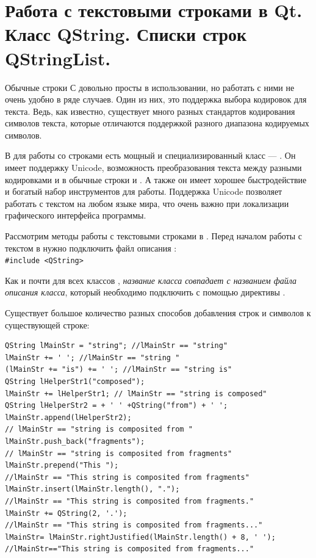 \section[Работа с текстовыми строками в Qt]{Работа с текстовыми строками в Qt. Класс QString. Списки строк QStringList.}

Обычные строки С довольно просты в использовании, но работать с ними не очень удобно в ряде
случаев. Один из них, это поддержка выбора кодировок для
текста. Ведь, как известно, существует много разных стандартов кодирования символов текста, которые
отличаются поддержкой разного диапазона кодируемых символов.

В  для работы со строками есть мощный и  специализированный класс ---
. Он имеет поддержку Unicode, возможность преобразования
текста между разными кодировками и в обычные строки  и . А также он имеет хорошее быстродействие и богатый
набор инструментов для работы. Поддержка Unicode позволяет работать с текстом на любом языке мира, что очень важно при
локализации графического интерфейса программы.

Рассмотрим методы работы с текстовыми строками в . Перед началом работы с текстом в  нужно подключить
файл описания :\\
\lstinline!#include <QString>!

Как и почти для всех классов , \emph{название класса совпадает с названием файла
описания класса}, который необходимо подключить с помощью директивы .

Существует большое количество разных способов добавления строк и символов к существующей строке:
\begin{lstlisting}
QString lMainStr = "string"; //lMainStr == "string"
lMainStr += ' '; //lMainStr == "string "
(lMainStr += "is") += ' '; //lMainStr == "string is"
QString lHelperStr1("composed");
lMainStr += lHelperStr1; // lMainStr == "string is composed"
QString lHelperStr2 = + ' ' +QString("from") + ' ';
lMainStr.append(lHelperStr2);
// lMainStr == "string is composited from "
lMainStr.push_back("fragments");
// lMainStr == "string is composited from fragments"
lMainStr.prepend("This ");
//lMainStr == "This string is composited from fragments"
lMainStr.insert(lMainStr.length(), ".");
//lMainStr == "This string is composited from fragments."
lMainStr += QString(2, '.');
//lMainStr == "This string is composited from fragments..."
lMainStr= lMainStr.rightJustified(lMainStr.length() + 8, ' ');
//lMainStr=="This string is composited from fragments..."
\end{lstlisting}


